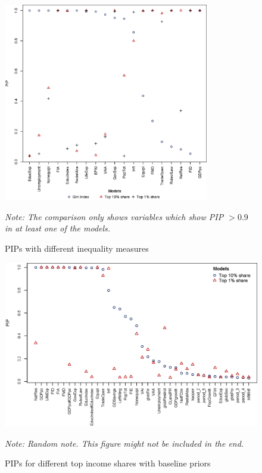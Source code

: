 \begin{refsection}
\begin{figure}
  \caption{\acp{PIP} with different inequality measures}
  \label{ch4fig:comp_ineq_sel}
  \centering
  \includegraphics[width=0.8\textwidth, keepaspectratio]{figures/ch4/comp_baseline_pip_sel}

  \begin{minipage}{0.8\textwidth}
    \footnotesize
    \emph{Note: The comparison only shows variables which show \ac{PIP} $> 0.9$ in at least one of the models.}
    \end{minipage}
\end{figure}

\begin{figure}
  \caption{\acp{PIP} for different top income shares with baseline priors}
  \label{ch4fig:comp_topshares}
  \centering
  \includegraphics[width=\textwidth, keepaspectratio]{figures/ch4/topsh_comparison_all}
  \begin{minipage}{0.8\textwidth}
    \footnotesize
    \emph{Note: Random note. This figure might not be included in the end.}
    \end{minipage}
\end{figure}


\end{refsection}
